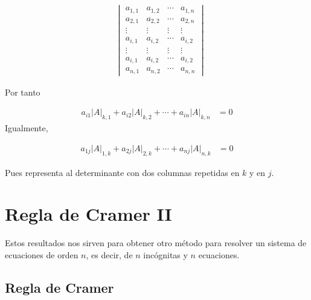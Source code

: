 \documentclass[
]{article}
\begin{document}
\begin{equation}
\begin{array}{cc}
   & \begin{vmatrix}
            a_{1,1}      &a_{1,2}    & \cdots     & a_{1,n}      \\ 
            a_{2,1}      &a_{2,2}    & \cdots     & a_{2,n}      \\
            \vdots       & \vdots    & \vdots     & \vdots       \\
            a_{i,1}      &a_{i,2}    & \cdots     & a_{i,2}      \\  
            \vdots       & \vdots    & \vdots    & \vdots         \\
            a_{i,1}      &a_{i,2}    & \cdots     & a_{i,2}      \\  
            a_{n,1}      &a_{n,2}    & \cdots     & a_{n,n} 
   \end{vmatrix}
\end{array}
\end{equation}

Por tanto

\begin{equation}
\begin{array}{cc}
     a_{i1}|A|_{k,1}+a_{i2}|A|_{k,2}+ \cdots + a_{in}|A|_{k,n} & = 0                         
\end{array}
\end{equation} Igualmente,

\begin{equation}
\begin{array}{cc}
     a_{1j}|A|_{1,k}+a_{2j}|A|_{2,k}+ \cdots + a_{nj}|A|_{n,k} & = 0                         
\end{array}
\end{equation}

Pues representa al determinante con dos columnas repetidas en \(k\) y en
\(j\).

\hypertarget{regla-de-cramer-ii}{%
\section{Regla de Cramer II}\label{regla-de-cramer-ii}}

Estos resultados nos sirven para obtener otro método para resolver un
sistema de ecuaciones de orden \(n\), es decir, de \(n\) incógnitas y
\(n\) ecuaciones.

\hypertarget{regla-de-cramer-1}{%
\subsection{Regla de Cramer}\label{regla-de-cramer-1}}
\end{document}
